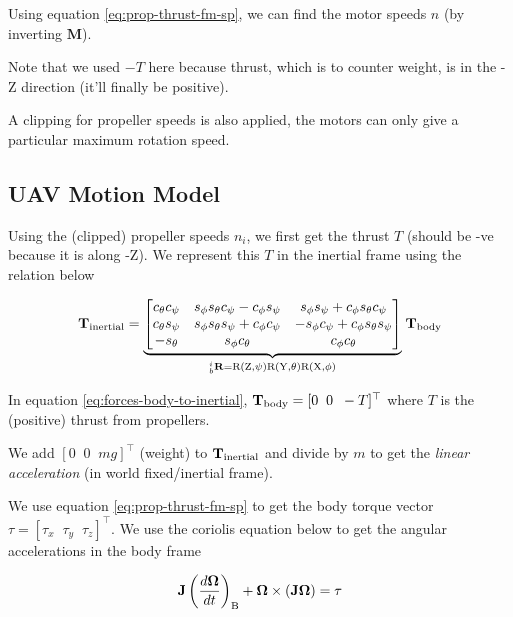 Using equation \ref{eq:prop-thrust-fm-sp}, we can find the motor speeds $n$ (by inverting $\mathbf{M}$).

Note that we used $-T$ here because thrust, which is to counter weight, is in the -Z direction (it'll finally be positive).

A clipping for propeller speeds is also applied, the motors can only give a particular maximum rotation speed.

\subsection{UAV Motion Model}

Using the (clipped) propeller speeds $n_i$, we first get the thrust $T$ (should be -ve because it is along -Z). We represent this $T$ in the inertial frame using the relation below

\begin{equation}
    \mathbf{T}_\textup{inertial} = \underset{^i_b\mathbf{R} = \textup{R}(\textup{Z},\psi) \textup{R}(\textup{Y},\theta) \textup{R}(\textup{X},\phi)}{\underbrace{
        \begin{bmatrix}
        c_\theta c_\psi & s_\phi s_\theta c_\psi - c_\phi s_\psi & s_\phi s_\psi + c_\phi s_\theta c_\psi \\
        c_\theta s_\psi & s_\phi s_\theta s_\psi + c_\phi c_\psi & -s_\phi c_\psi + c_\phi s_\theta s_\psi \\
        -s_\theta & s_\phi c_\theta & c_\phi c_\theta
        \end{bmatrix}}
    } \; \mathbf{T}_{\textup{body}}
    \label{eq:forces-body-to-inertial}
\end{equation}

In equation \ref{eq:forces-body-to-inertial}, $\mathbf{T}_{\textup{body}} = [0\;\;0\;\;-T]^\top$ where $T$ is the (positive) thrust from propellers.

We add $[0\;\;0\;\;mg]^\top$ (weight) to $\mathbf{T}_\textup{inertial}$ and divide by $m$ to get the \emph{linear acceleration} (in world fixed/inertial frame).

We use equation \ref{eq:prop-thrust-fm-sp} to get the body torque vector $\tau = [\tau_x \;\; \tau_y \;\; \tau_z]^\top$. We use the coriolis equation below to get the angular accelerations in the body frame

\begin{equation}
    \mathbf{J} \left ( \frac{d \mathbf{\Omega}}{dt} \right )_{\textup{B}} + \mathbf{\Omega} \times (\mathbf{J \Omega}) = \tau
    \label{eq:coriolis-angacc-body}
\end{equation}

